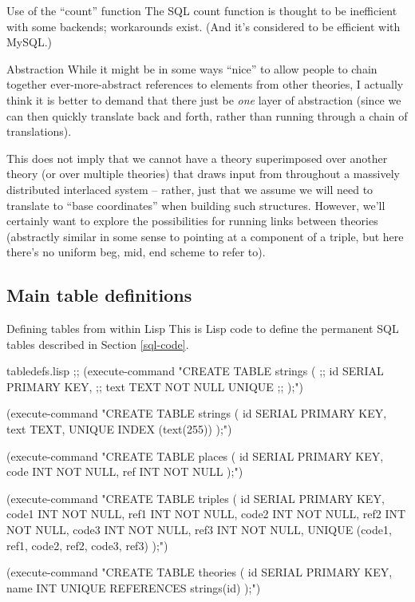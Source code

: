 \begin{notate}{Use of the ``count'' function}
The SQL count function is thought to be inefficient with
some backends; workarounds exist.  (And it's considered to
be efficient with MySQL.)
\end{notate}

\begin{notate}{Abstraction} \label{abstraction}
While it might be in some ways ``nice'' to allow people to
chain together ever-more-abstract references to elements
from other theories, I actually think it is better to
demand that there just be \emph{one} layer of abstraction
(since we can then quickly translate back and forth,
rather than running through a chain of translations).

This does not imply that we cannot have a theory
superimposed over another theory (or over multiple
theories) that draws input from throughout a massively
distributed interlaced system -- rather, just that we
assume we will need to translate to ``base coordinates''
when building such structures.  However, we'll certainly
want to explore the possibilities for running links
between theories (abstractly similar in some sense to
pointing at a component of a triple, but here there's no
uniform beg, mid, end scheme to refer to).
\end{notate}

\subsection{Main table definitions}

\begin{notate}{Defining tables from within Lisp}
This is Lisp code to define the permanent SQL tables
described in Section \ref{sql-code}.
\end{notate}

\begin{common}{tabledefs.lisp}
;; (execute-command "CREATE TABLE strings (
;;    id SERIAL PRIMARY KEY,
;;    text TEXT NOT NULL UNIQUE
;; );")

(execute-command "CREATE TABLE strings (
   id SERIAL PRIMARY KEY,
   text TEXT,
   UNIQUE INDEX (text(255))
);")

(execute-command "CREATE TABLE places (
   id SERIAL PRIMARY KEY,
   code INT NOT NULL,
   ref INT NOT NULL
);")

(execute-command "CREATE TABLE triples (
   id SERIAL PRIMARY KEY,
   code1 INT NOT NULL,
   ref1 INT NOT NULL,
   code2 INT NOT NULL,
   ref2 INT NOT NULL,
   code3 INT NOT NULL,
   ref3 INT NOT NULL,
   UNIQUE (code1, ref1,
           code2, ref2,
           code3, ref3)
);")

(execute-command "CREATE TABLE theories (
  id SERIAL PRIMARY KEY,
  name INT UNIQUE REFERENCES strings(id)
);")
\end{common}

